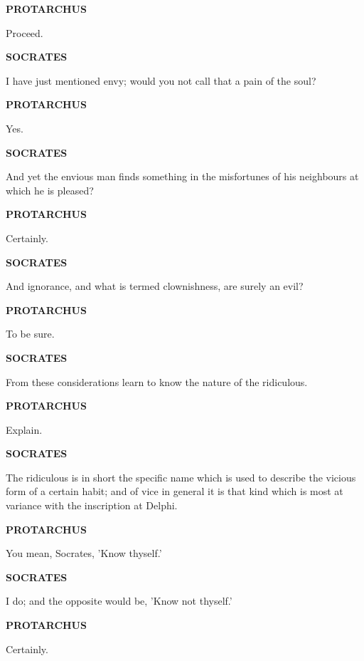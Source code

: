 \documentclass[11pt,letter]{article}
\begin{document}
\par \textbf{PROTARCHUS}
\par   Proceed.

\par \textbf{SOCRATES}
\par   I have just mentioned envy; would you not call that a pain of the soul?

\par \textbf{PROTARCHUS}
\par   Yes.

\par \textbf{SOCRATES}
\par   And yet the envious man finds something in the misfortunes of his neighbours at which he is pleased?

\par \textbf{PROTARCHUS}
\par   Certainly.

\par \textbf{SOCRATES}
\par   And ignorance, and what is termed clownishness, are surely an evil?

\par \textbf{PROTARCHUS}
\par   To be sure.

\par \textbf{SOCRATES}
\par   From these considerations learn to know the nature of the ridiculous.

\par \textbf{PROTARCHUS}
\par   Explain.

\par \textbf{SOCRATES}
\par   The ridiculous is in short the specific name which is used to describe the vicious form of a certain habit; and of vice in general it is that kind which is most at variance with the inscription at Delphi.

\par \textbf{PROTARCHUS}
\par   You mean, Socrates, 'Know thyself.'

\par \textbf{SOCRATES}
\par   I do; and the opposite would be, 'Know not thyself.'

\par \textbf{PROTARCHUS}
\par   Certainly.
\end{document}
